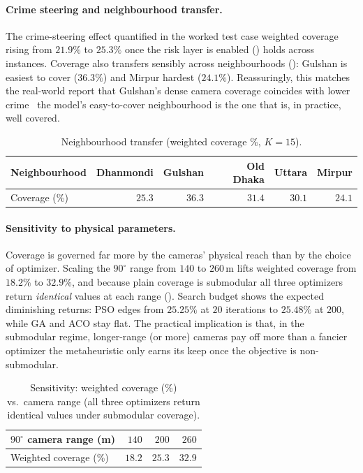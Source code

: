 \documentclass{ai-lab-report}
\begin{document}
\paragraph{Crime steering and neighbourhood transfer.}
The crime-steering effect quantified in the worked test case weighted coverage rising from $21.9\%$ to $25.3\%$ once the risk layer is enabled () holds across instances. Coverage also transfers sensibly across neighbourhoods (): Gulshan is easiest to cover ($36.3\%$) and Mirpur hardest ($24.1\%$). Reassuringly, this matches the real-world report that Gulshan's dense camera coverage coincides with lower crime~\citep{dailystar2023cctv} the model's easy-to-cover neighbourhood is the one that is, in practice, well covered.

\begin{table}[H]
\centering
\small
\begin{tabularx}{\linewidth}{@{}Xrrrrr@{}}
\toprule
Neighbourhood & Dhanmondi & Gulshan & Old Dhaka & Uttara & Mirpur \\
\midrule
Coverage (\%) & $25.3$ & $\mathbf{36.3}$ & $31.4$ & $30.1$ & $24.1$ \\
\bottomrule
\end{tabularx}
\caption{Neighbourhood transfer (weighted coverage \%, $K{=}15$).}
\label{tab:a3area}
\end{table}

\paragraph{Sensitivity to physical parameters.} Coverage is governed far more by the cameras' physical reach than by the choice of optimizer. Scaling the $90^\circ$ range from $140$ to $260$\,m lifts weighted coverage from $18.2\%$ to $32.9\%$, and because plain coverage is submodular all three optimizers return \emph{identical} values at each range (). Search budget shows the expected diminishing returns: PSO edges from $25.25\%$ at $20$ iterations to $25.48\%$ at $200$, while GA and ACO stay flat. The practical implication is that, in the submodular regime, longer-range (or more) cameras pay off more than a fancier optimizer the metaheuristic only earns its keep once the objective is non-submodular.

\begin{table}[H]
\centering
\small
\begin{tabularx}{\linewidth}{@{}Xrrr@{}}
\toprule
$90^\circ$ camera range (m) & $140$ & $200$ & $260$ \\
\midrule
Weighted coverage (\%) & $18.2$ & $25.3$ & $32.9$ \\
\bottomrule
\end{tabularx}
\caption{Sensitivity: weighted coverage (\%) vs.\ camera range (all three optimizers return identical values under submodular coverage).}
\label{tab:a3range}
\end{table}
\end{document}
